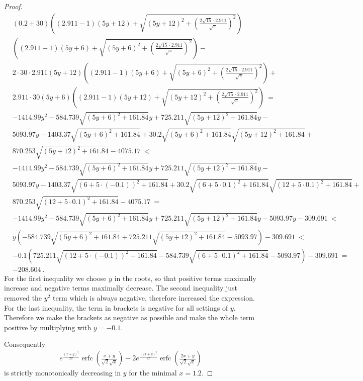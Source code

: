 \documentclass{article}
\DeclareMathOperator{\erfc}{erfc}
\begin{document}
\begin{proof}
\begin{align}
&(0.2 +30) \left((2.911 -1) (5 y+12)+\sqrt{(5 y+12)^2+\left(\frac{2 \sqrt{15} \cdot 2.911}{\sqrt{\pi }}\right)^2}\right)\\ \nonumber & \left((2.911 -1) (5 y+6)+\sqrt{(5 y+6)^2+\left(\frac{2 \sqrt{15} \cdot 2.911}{\sqrt{\pi }}\right)^2}\right)-\\ \nonumber &2 \cdot 30 \cdot 2.911 (5 y+12) \left((2.911 -1) (5 y+6)+\sqrt{(5 y+6)^2+\left(\frac{2 \sqrt{15} \cdot 2.911}{\sqrt{\pi }}\right)^2}\right)+\\ \nonumber &2.911 \cdot 30 (5 y+6) \left((2.911 -1) (5 y+12)+\sqrt{(5 y+12)^2+\left(\frac{2 \sqrt{15} \cdot 2.911}{\sqrt{\pi }}\right)^2}\right)\ = \\ \nonumber &-1414.99 y^2-584.739 \sqrt{(5 y+6)^2+161.84} y+725.211 \sqrt{(5 y+12)^2+161.84} y-\\ \nonumber &5093.97 y-1403.37 \sqrt{(5 y+6)^2+161.84}+30.2 \sqrt{(5 y+6)^2+161.84} \sqrt{(5 y+12)^2+161.84}+\\ \nonumber &870.253 \sqrt{(5 y+12)^2+161.84}-4075.17\ < \\ \nonumber &-1414.99 y^2-584.739 \sqrt{(5 y+6)^2+161.84} y+725.211 \sqrt{(5 y+12)^2+161.84} y-\\ \nonumber &5093.97 y-1403.37 \sqrt{(6+5 \cdot (-0.1))^2+161.84}+30.2 \sqrt{(6+5 \cdot 0.1)^2+161.84} \sqrt{(12+5 \cdot 0.1)^2+161.84}+\\ \nonumber &870.253 \sqrt{(12+5 \cdot 0.1)^2+161.84}-4075.17\ = \\ \nonumber &-1414.99 y^2-584.739 \sqrt{(5 y+6)^2+161.84} y+725.211 \sqrt{(5 y+12)^2+161.84} y-5093.97 y-309.691\ < \\ \nonumber &y \left(-584.739 \sqrt{(5 y+6)^2+161.84}+725.211 \sqrt{(5 y+12)^2+161.84}-5093.97\right)-309.691\ < \\ \nonumber &-0.1 \left(725.211 \sqrt{(12+5 \cdot (-0.1))^2+161.84}-584.739 \sqrt{(6+5 \cdot 0.1)^2+161.84}-5093.97\right)-309.691 
 \ = \\ \nonumber &-208.604 \ .
\end{align}
For the first inequality we choose $y$ in the roots, so that 
positive terms maximally increase and negative terms maximally decrease.
The second inequality just removed the $y^2$ term which is always
negative, therefore increased the expression.
For the last inequality, the term in brackets 
is negative for all settings of $y$. 
Therefore we make the brackets as negative as possible 
and make the whole term positive by multiplying with $y=-0.1$.

Consequently 
\begin{align}
e^{\frac{(x+y)^2}{2 x}} \erfc \left(\frac{x+y}{\sqrt{2} \sqrt{x}}\right)-2 e^{\frac{(2 x+y)^2}{2 x}} \erfc \left(\frac{2 x+y}{\sqrt{2} \sqrt{x}}\right)
\end{align}
is strictly monotonically decreasing in $y$ for the minimal
$x=1.2$. 
\end{proof}
\end{document}
